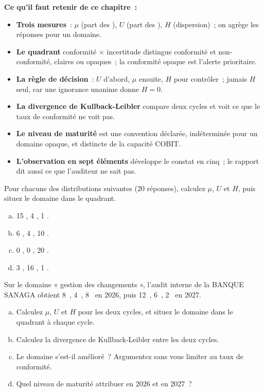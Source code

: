 \begin{boxresume}
\textbf{Ce qu'il faut retenir de ce chapitre~:}
\begin{itemize}
    \item \textbf{Trois mesures}~: $\mu$ (part des \OUI{}), $U$ (part des
          \NEK{}), $H$ (dispersion)~; on agrège les réponses pour un domaine.
    \item \textbf{Le quadrant} conformité × incertitude distingue
          conformité et non-conformité, claires ou opaques~; la conformité
          opaque est l'alerte prioritaire.
    \item \textbf{La règle de décision}~: $U$ d'abord, $\mu$ ensuite, $H$ pour
          contrôler~; jamais $H$ seul, car une ignorance unanime donne
          $H = 0$.
    \item \textbf{La divergence de Kullback-Leibler} compare deux cycles et
          voit ce que le taux de conformité ne voit pas.
    \item \textbf{Le niveau de maturité} est une convention déclarée,
          indéterminée pour un domaine opaque, et distincte de la capacité
          COBIT.
    \item \textbf{L'observation en sept éléments} développe le constat en
          cinq~; le rapport dit aussi ce que l'auditeur ne sait pas.
\end{itemize}
\end{boxresume}

\bigskip

\begin{boxexo}[title={\ding{45}\quad Exercice~9.1. Calculer et situer \niveaubase}]
Pour chacune des distributions suivantes (20 réponses), calculez $\mu$, $U$
et $H$, puis situez le domaine dans le quadrant.
\begin{enumerate}[(a)]
    \item 15 \OUI{}, 4 \NON{}, 1 \NEK{}.
    \item 6 \OUI{}, 4 \NON{}, 10 \NEK{}.
    \item 0 \OUI{}, 0 \NON{}, 20 \NEK{}.
    \item 3 \OUI{}, 16 \NON{}, 1 \NEK{}.
\end{enumerate}
\end{boxexo}

\begin{boxexo}[title={\ding{45}\quad Exercice~9.2. Deux cycles à la BANQUE SANAGA \niveaumoyen}]
Sur le domaine « gestion des changements », l'audit interne de la BANQUE
SANAGA obtient 8~\OUI{}, 4~\NON{}, 8~\NEK{} en 2026, puis 12~\OUI{},
6~\NON{}, 2~\NEK{} en 2027.
\begin{enumerate}[(a)]
    \item Calculez $\mu$, $U$ et $H$ pour les deux cycles, et situez le
          domaine dans le quadrant à chaque cycle.
    \item Calculez la divergence de Kullback-Leibler entre les deux cycles.
    \item Le domaine s'est-il amélioré~? Argumentez sans vous limiter au
          taux de conformité.
    \item Quel niveau de maturité attribuer en 2026 et en 2027~?
\end{enumerate}
\end{boxexo}

